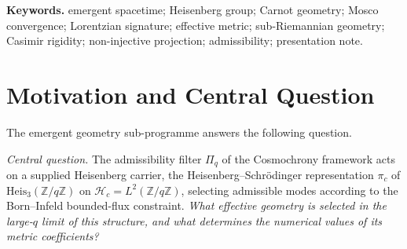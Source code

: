 \documentclass[11pt,a4paper]{article}
\theoremstyle{definition}
\newcommand{\Heis}{\mathrm{Heis}}
\newcommand{\su}{\mathfrak{su}}
\newcommand{\geff}{g^{\mu\nu}}
\begin{document}
\begin{abstract}
    the spatial one (Q11), and the isotropy route of Q10 rests on inputs that are not supplied;
    the value 2 is the eigenvalue of the $\su(2)$ Casimir on the spin-one module in one
    normalisation of the generators, not a coefficient.
    On the signature axis, Q5b establishes, conditionally, a rank-three co-metric whose
    non-degenerate block has signature $(-,+,+)$; the rank-four extension that the last link
    of the chain presupposes is not constructed (open problem Q5b-O2), and the endpoint
    $\geff \propto \eta^{\mu\nu}$ holds only for an extension satisfying the hypotheses of Q11
    Corollary~6.1 ([T] and [INV$^+$] of Q8, [ACT$_\tau$] invariance and a negative ordering term), after rescaling $\tau$, with its
    overall scale free.
    Question Q5 is open.
    \emph{Interpretive outlook (a reading, not a result).}
    If a spatial limit operator, the lifting step, the hyperbolicity hypothesis, a rank-four
    extension satisfying the hypotheses of Q11 Corollary~6.1 and an independent
    datum fixing the temporal-to-spatial ratio were all supplied, the chain would describe an
    effective spacetime reconstructed from admissibility rather than postulated; as it stands,
    it identifies which inputs such a reconstruction requires, and representation theory
    fixes the shapes of the invariant forms, not their sizes.
  \end{abstract}

  \medskip
  \noindent\textbf{Keywords.}
  emergent spacetime; Heisenberg group; Carnot geometry; Mosco convergence; Lorentzian
  signature; effective metric; sub-Riemannian geometry; Casimir rigidity; non-injective
  projection; admissibility; presentation note.

  \newpage
  \tableofcontents

  \newpage

  \section{Motivation and Central Question}
    \label{sec:motivation}

    The emergent geometry sub-programme answers the following question.

    \medskip
    \noindent\textit{Central question.}
    The admissibility filter $\Pi_q$ of the Cosmochrony framework acts on a supplied
    Heisenberg carrier, the Heisenberg--Schr\"{o}dinger representation $\pi_c$ of
    $\Heis_3(\mathbb{Z}/q\mathbb{Z})$ on $\mathcal{H}_c = L^2(\mathbb{Z}/q\mathbb{Z})$, selecting
    admissible modes according to the Born--Infeld bounded-flux constraint.
    \textit{What effective geometry is selected in the large-$q$ limit of this structure,
      and what determines the numerical values of its metric coefficients?}
\end{document}
